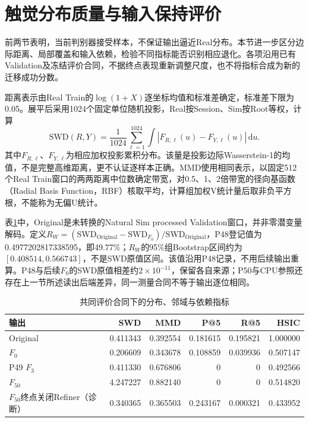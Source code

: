 \section{触觉分布质量与输入保持评价}
\label{sec:ch06_distribution_quality_input_preservation}

前两节表明，当前判别器接受样本，不保证输出逼近Real分布。本节进一步区分边际距离、局部覆盖和输入依赖，检验不同指标能否识别相应退化。各项沿用已有Validation及冻结评价合同，不据终点表现重新调整尺度，也不将指标合成为新的迁移成功分数。

距离表示由Real Train的$\log(1+X)$逐坐标均值和标准差确定，标准差下限为0.05。展平后采用1024个固定单位随机投影，Real按Session、Sim按Root等权，计算
\begin{equation}
 \mathrm{SWD}(R,Y)=\frac{1}{1024}\sum_{\ell=1}^{1024}
 \int\left|F_{R,\ell}(u)-F_{Y,\ell}(u)\right|\,\mathrm du .
 \label{eq:ch06_projected_wasserstein}
\end{equation}
其中$F_{R,\ell}$、$F_{Y,\ell}$为相应加权投影累积分布。该量是投影边际Wasserstein-1的均值，不是完整高维距离，更不认证逐样本正确。MMD使用相同表示，以固定512个Real Train窗口的两两距离中位数确定带宽，对0.5、1、2倍带宽的径向基函数（Radial Basis Function，RBF）核取平均，计算组加权V统计量后取非负平方根，不能称为无偏U统计。

表\ref{tab:ch06_quality_dependency_comparison}中，Original是未转换的Natural Sim processed Validation窗口，并非零潜变量解码。定义$R_W=(\mathrm{SWD}_{\mathrm{Original}}-\mathrm{SWD}_{F_0})/\mathrm{SWD}_{\mathrm{Original}}$，P48登记值为0.4977202817338595，即49.77\%；$R_W$的95\%组Bootstrap区间约为$[0.408514,0.566743]$，不是SWD原值区间。该值沿用P48记录，不用后续输出重算。P48与后续$F_0$的SWD原值相差约$2\times10^{-11}$，保留各自来源；P50与CPU参照还存在上一节所述读出后端差异，同一测量合同不等于输出逐位相同。

\begin{table}[htbp]
\centering
\caption{共同评价合同下的分布、邻域与依赖指标}
\label{tab:ch06_quality_dependency_comparison}
\begingroup\setlength{\tabcolsep}{3.5pt}
\begin{tabular}{lrrrrr}
\toprule
输出 & SWD & MMD & P@5 & R@5 & HSIC\\
\midrule
Original & 0.411343 & 0.392554 & 0.181615 & 0.195821 & 1.000000\\
$F_0$ & 0.206609 & 0.343678 & 0.108859 & 0.039936 & 0.507147\\
P49 $F_3$ & 0.411330 & 0.676806 & 0 & 0 & 0.492566\\
$F_{50}$ & 4.247227 & 0.882140 & 0 & 0 & 0.514820\\
 $F_{50}$终点关闭Refiner（诊断） & 0.340365 & 0.365503 & 0.243167 & 0.000321 & 0.433952\\
\bottomrule
\end{tabular}
\endgroup
\end{table}

